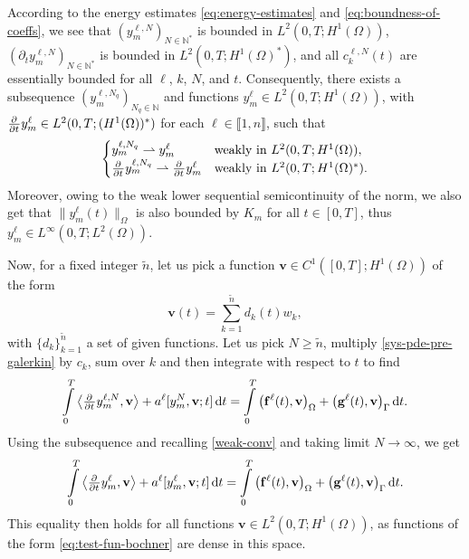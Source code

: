 \documentclass[11pt]{article}
\newcommand{\N}{\mathbb{N}}
\newcommand{\llb}{\llbracket}
\newcommand{\rrb}{\rrbracket}
\newcommand{\bv}{\mathbf{v}}
\numberwithin{equation}{section}
\begin{document}
	According to the energy estimates \eqref{eq:energy-estimates} and \eqref{eq:boundness-of-coeffs}, we see that \(( y_m^{\ell,N})_{N\in \N^*}\) is bounded in \(L^2(0,T;H^1(\Omega))\), \((\partial_t  y_m^{\ell,N})_{N\in \N^*}\) is bounded in \(L^2(0,T;H^1(\Omega)^*)\), and all \( c_k^{\ell,N} (t)\) are essentially bounded for all \(\ell\), \(k\), \(N\), and \(t\). 
	Consequently, there exists a subsequence \(( y_m^{\ell,N_q})_{N_q\in \N}\) and functions \( y_m^{\ell} \in L^2(0,T;H^1(\Omega))\),  with \(\pd{ }{t} y_m^{\ell} \in L^2(0,T;(H^1(\Omega))^*)\) for each \(\ell \in \llb1,n\rrb\), such that
	\begin{equation}
	\label{weak-conv}
		\begin{cases}
			 y_m^{\ell,N_q} \rightharpoonup  y_m^{\ell} & \text{weakly in } L^2(0,T;H^1(\Omega)),
			\\
			\pd{ }{t} y_m^{\ell,N_q} \rightharpoonup \pd{ }{t}  y_m^{\ell} & \text{weakly in } L^2(0,T;H^1(\Omega)^*).
		\end{cases}
	\end{equation}
	Moreover, owing to the weak lower sequential semicontinuity of the norm, we also get that \(\| y_m^\ell(t)\|_\Omega\) is also bounded by \(K_{m}\) for all \(t\in [0,T]\), thus \( y_m^\ell \in L^\infty (0,T; L^2 (\Omega))\).



Now, for a fixed integer \(\tilde n\), let us pick a function \( \bv \in C^1([0,T]; H^1(\Omega))\) of the form
	\begin{equation}
	\label{eq:test-fun-bochner}
		\bv(t) = \sum_{k=1}^{\tilde n} d_k(t) w_k,
	\end{equation}
	with \(\{d_k\}_{k=1}^{\tilde n}\) a set of given functions.
	Let us pick \(N \geq \tilde n\), multiply \eqref{sys-pde-pre-galerkin} by \(c_k\), sum over \(k\) and then integrate with respect to \(t\) to find
	\[
		\int\limits_0^T
		\big\langle \pd{ }{t}  y_m^{\ell,N}, \bv \big\rangle + 
		a^\ell [y_m^{N}, \bv; t] \dif t
		=
		\int\limits_0^T
		\big( \mathbf{f}^\ell (t), \bv \big)_{\Omega} + \big(\mathbf{g}^\ell (t),  \bv \big)_{\Gamma}
		\dif t.
	\]
	Using the subsequence and recalling \eqref{weak-conv} and taking limit \(N\to \infty\), we get
	\begin{equation}
	\label{eq:variational}
		\int\limits_0^T
		\big\langle \pd{ }{t}  y_m^{\ell}, \bv \big\rangle + 
		a^\ell [y_m^{\ell}, \bv; t] \dif t
		=
		\int\limits_0^T
		\big( \mathbf{f}^\ell (t), \bv \big)_{\Omega} + \big(\mathbf{g}^\ell (t),  \bv \big)_{\Gamma}
		\dif t.
	\end{equation}
	This equality then holds for all functions \( \bv \in L^2(0,T;H^1(\Omega))\), as functions of the form \eqref{eq:test-fun-bochner} are dense in this space. %
	
\end{document}
